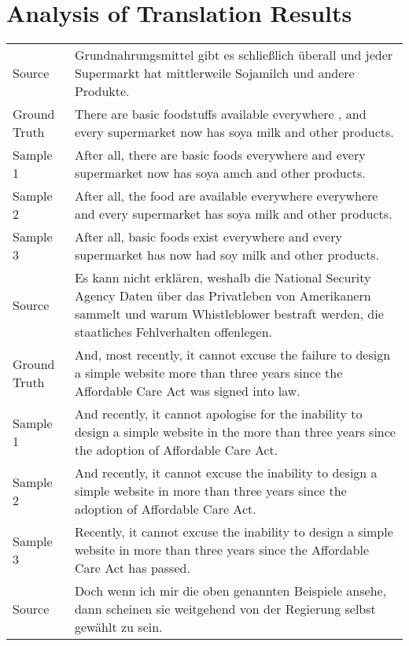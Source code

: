 \documentclass[11pt,a4paper]{article}
\begin{document}
\section{Analysis of Translation Results}\label{appendix:sample}
\begin{table*}[ht!]
\centering
\begin{tabular}{p{2.5cm}p{12cm}}
\toprule

\textcolor{myblue}{Source} & \textcolor{myblue}{Grundnahrungsmittel gibt es schließlich überall und jeder Supermarkt hat mittlerweile Sojamilch und andere Produkte.} \\
\textcolor{mypink}{Ground Truth} & 
\textcolor{mypink}{There are basic foodstuffs available everywhere , and every supermarket now has soya milk and other products.} \\
Sample 1 &  
After all, there are basic foods everywhere and every supermarket now has soya amch and other products. \\
Sample 2 &  After all, the food are available everywhere everywhere and every supermarket has soya milk and other products. \\
Sample 3 & After all, basic foods exist everywhere and every supermarket has now had soy milk and other products. \\
\midrule
\textcolor{myblue}{Source} & \textcolor{myblue}{Es kann nicht erkl\"{a}ren, weshalb die National Security Agency Daten über das Privatleben von Amerikanern sammelt und warum Whistleblower bestraft werden, die staatliches Fehlverhalten offenlegen.}\\
\textcolor{mypink}{Ground Truth} & \textcolor{mypink}{And, most recently, it cannot excuse the failure to design a simple website more than three years since the Affordable Care Act was signed into law.}\\
Sample 1 &  And recently, it cannot apologise for the inability to design a simple website in the more than three years since the adoption of Affordable Care Act.\\
Sample 2 &  And recently, it cannot excuse the inability to design a simple website in more than three years since the adoption of Affordable Care Act.\\
Sample 3 & Recently, it cannot excuse the inability to design a simple website in more than three years since the Affordable Care Act has passed. \\
\midrule
\textcolor{myblue}{Source} & \textcolor{myblue}{Doch wenn ich mir die oben genannten Beispiele ansehe, dann scheinen sie weitgehend von der Regierung selbst gew\"{a}hlt zu sein.}\\

\end{tabular}
\end{table*}
\end{document}
